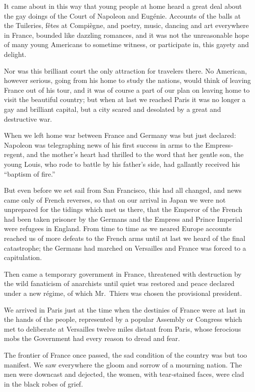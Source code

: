 \documentclass[12pt]{book}
\begin{document}
It came about in this way that young people at home heard a great deal about
the gay doings of the Court of Napoleon and Eugénie. Accounts of the balls at
the Tuileries, fêtes at Compiègne, and poetry, music, dancing and art everywhere
in France, bounded like dazzling romances, and it was not the unreasonable hope
of many young Americans to sometime witness, or participate in, this gayety and
delight.

Nor was this brilliant court the only attraction for travelers there. No American, however serious, going from his home to study the nations, would think of
leaving France out of his tour, and it was of course a part of our plan on leaving
home to visit the beautiful country; but when at last we reached Paris it was no
longer a gay and brilliant capital, but a city scared and desolated by a great and
destructive war.

When we left home war between France and Germany was but just declared:
Napoleon was telegraphing news of his first success in arms to the Empress‐regent,
and the mother’s heart had thrilled to the word that her gentle son, the young
Louis, who rode to battle by his father’s side, had gallantly received his “baptism
of fire.”

But even before we set sail from San Francisco, this had all changed, and
news came only of French reverses, so that on our arrival in Japan we were not
unprepared for the tidings which met us there, that the Emperor of the French had
been taken prisoner by the Germans and the Empress and Prince Imperial were
refugees in England. From time to time as we neared Europe accounts reached us
of more defeats to the French arms until at last we heard of the final catastrophe;
the Germans had marched on Versailles and France was forced to a capitulation.

Then came a temporary government in France, threatened with destruction
by the wild fanaticism of anarchists until quiet was restored and peace declared
under a new régime, of which Mr.~Thiers was chosen the provisional president.

We arrived in Paris just at the time when the destinies of France were at last
in the hands of the people, represented by a popular Assembly or Congress which
met to deliberate at Versailles twelve miles distant from Paris, whose ferocious
mobs the Government had every reason to dread and fear.

The frontier of France once passed, the sad condition of the country was but
too manifest. We saw everywhere the gloom and sorrow of a mourning nation.
The men were downcast and dejected, the women, with tear‐stained faces, were
clad in the black robes of grief.
\end{document}
